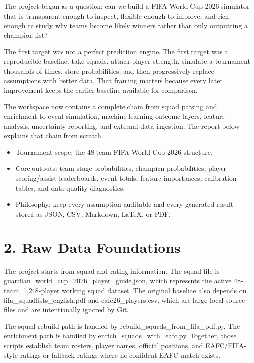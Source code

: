 \documentclass[10pt]{article}
\begin{document}
The project began as a question: can we build a FIFA World Cup 2026 simulator that is transparent enough to inspect, flexible enough to improve, and rich enough to study why teams become likely winners rather than only outputting a champion list?

The first target was not a perfect prediction engine. The first target was a reproducible baseline: take squads, attach player strength, simulate a tournament thousands of times, store probabilities, and then progressively replace assumptions with better data. That framing matters because every later improvement keeps the earlier baseline available for comparison.

The workspace now contains a complete chain from squad parsing and enrichment to event simulation, machine-learning outcome layers, feature analysis, uncertainty reporting, and external-data ingestion. The report below explains that chain from scratch.

\begin{itemize}
  \item Tournament scope: the 48-team FIFA World Cup 2026 structure.
  \item Core outputs: team stage probabilities, champion probabilities, player scoring/assist leaderboards, event totals, feature importances, calibration tables, and data-quality diagnostics.
  \item Philosophy: keep every assumption auditable and every generated result stored as JSON, CSV, Markdown, LaTeX, or PDF.
\end{itemize}

\section{2. Raw Data Foundations}

The project starts from squad and rating information. The squad file is guardian\_world\_cup\_2026\_player\_guide.json, which represents the active 48-team, 1,248-player working squad dataset. The original baseline also depends on fifa\_squadlists\_english.pdf and eafc26\_players.csv, which are large local source files and are intentionally ignored by Git.

The squad rebuild path is handled by rebuild\_squads\_from\_fifa\_pdf.py. The enrichment path is handled by enrich\_squads\_with\_eafc.py. Together, those scripts establish team rosters, player names, official positions, and EAFC/FIFA-style ratings or fallback ratings where no confident EAFC match exists.
\end{document}
